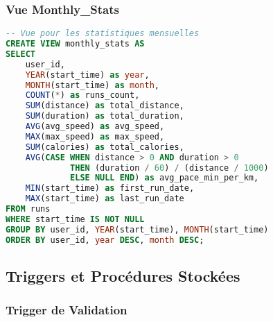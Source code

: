 \subsubsection{Vue Monthly\_Stats}

\begin{lstlisting}[language=sql]
-- Vue pour les statistiques mensuelles
CREATE VIEW monthly_stats AS
SELECT 
    user_id,
    YEAR(start_time) as year,
    MONTH(start_time) as month,
    COUNT(*) as runs_count,
    SUM(distance) as total_distance,
    SUM(duration) as total_duration,
    AVG(avg_speed) as avg_speed,
    MAX(max_speed) as max_speed,
    SUM(calories) as total_calories,
    AVG(CASE WHEN distance > 0 AND duration > 0 
             THEN (duration / 60) / (distance / 1000) 
             ELSE NULL END) as avg_pace_min_per_km,
    MIN(start_time) as first_run_date,
    MAX(start_time) as last_run_date
FROM runs 
WHERE start_time IS NOT NULL 
GROUP BY user_id, YEAR(start_time), MONTH(start_time)
ORDER BY user_id, year DESC, month DESC;
\end{lstlisting}

\subsection{Triggers et Procédures Stockées}

\subsubsection{Trigger de Validation}

